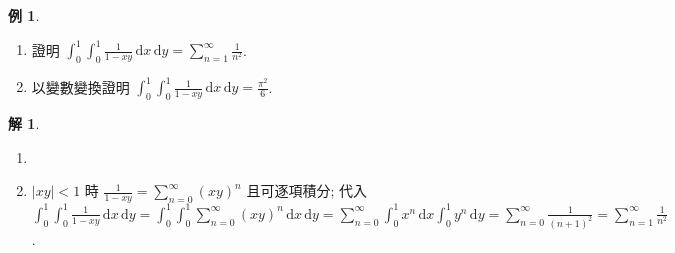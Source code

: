 \documentclass[12pt]{extarticle}
\newcommand{\ds}{\displaystyle}
\theoremstyle{definition}
\newtheorem*{ex}{例}
\newtheorem*{sol}{解}
\begin{document}
\begin{ex}
  \setlength{\columnsep}{-10mm}
  \begin{multicols}{2}
    \begin{enumerate}\setlength{\itemsep}{0pt}
      \item 證明 $\ds\int_0^1\!\int_0^1\!\frac{1}{1 - xy}\,\text{d}x\,\text{d}y = \sum_{n = 1}^\infty\frac{1}{n^2}$.
      \item 以變數變換證明 $\ds\int_0^1\!\int_0^1\!\frac{1}{1 - xy}\,\text{d}x\,\text{d}y = \frac{\pi^2}{6}$.
    \end{enumerate}
  \end{multicols}
\end{ex}

\begin{sol}
  \begin{enumerate}\setlength{\itemsep}{0pt}
    \item[]
    \item $\ds|xy| < 1$ 時 $\ds\frac{1}{1 - xy} = \sum_{n = 0}^\infty(xy)^n$ 且可逐項積分; 代入 $\ds\int_0^1\!\int_0^1\!\frac{1}{1 - xy}\,\text{d}x\,\text{d}y = \int_0^1\!\int_0^1\sum_{n = 0}^\infty(xy)^n\,\text{d}x\,\text{d}y = \sum_{n = 0}^\infty\int_0^1\! x^n\,\text{d}x\int_0^1\!y^n\,\text{d}y = \sum_{n = 0}^\infty\frac{1}{(n + 1)^2} = \sum_{n = 1}^\infty\frac{1}{n^2}$.

\end{enumerate}
\end{sol}
\end{document}
